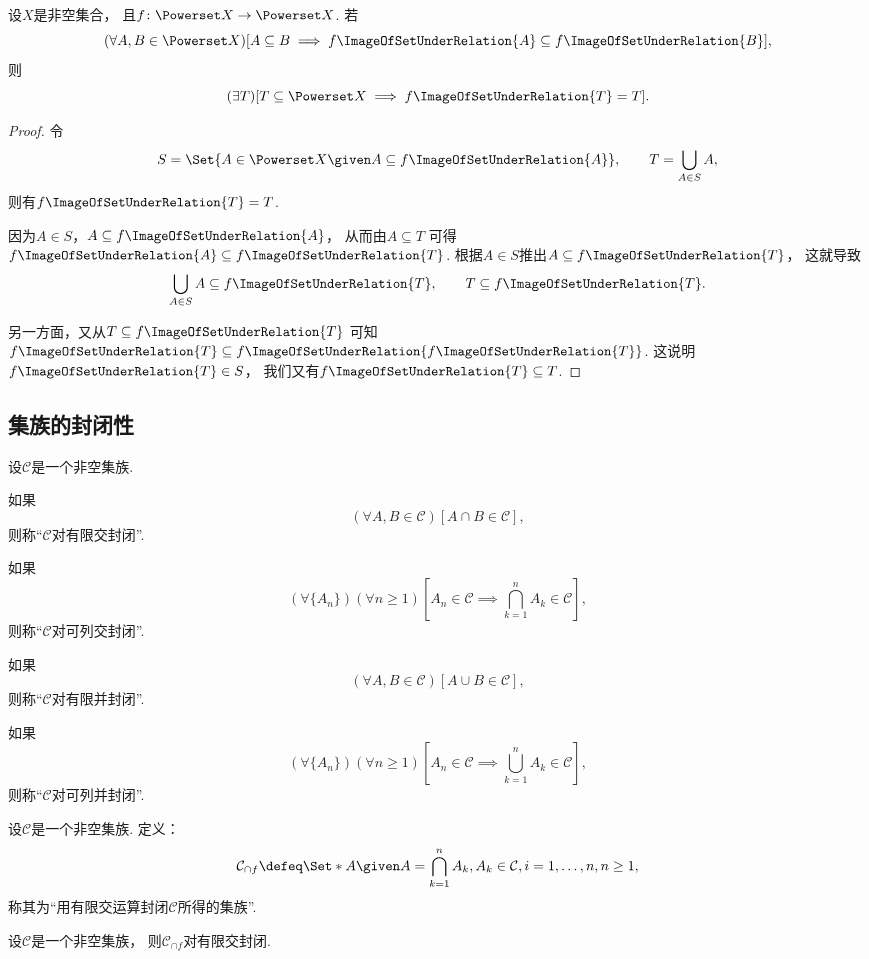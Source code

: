 \begin{example}
设\(X\)是非空集合，
且\(f\colon \Powerset X \to \Powerset X\).
若\[
	(\forall A,B \in \Powerset X)
	[
		A \subseteq B
		\implies
		f\ImageOfSetUnderRelation{A} \subseteq f\ImageOfSetUnderRelation{B}
	],
\]
则\[
	(\exists T)
	[
		T \subseteq \Powerset X
		\implies
		f\ImageOfSetUnderRelation{T} = T
	].
\]
\begin{proof}
令\[
	S = \Set{ A \in \Powerset X \given A \subseteq f\ImageOfSetUnderRelation{A} },
	\qquad
	T = \bigcup_{A \in S} A,
\]
则有\(f\ImageOfSetUnderRelation{T} = T\).

因为\(A \in S\)，\(A \subseteq f\ImageOfSetUnderRelation{A}\)，
从而由\(A \subseteq T\)
可得\(f\ImageOfSetUnderRelation{A} \subseteq f\ImageOfSetUnderRelation{T}\).
根据\(A \in S\)推出\(A \subseteq f\ImageOfSetUnderRelation{T}\)，
这就导致\[
	\bigcup_{A \in S} A \subseteq f\ImageOfSetUnderRelation{T},
	\qquad
	T \subseteq f\ImageOfSetUnderRelation{T}.
\]

另一方面，又从\(T \subseteq f\ImageOfSetUnderRelation{T}\)
可知\(f\ImageOfSetUnderRelation{T} \subseteq f\ImageOfSetUnderRelation{f\ImageOfSetUnderRelation{T}}\).
这说明\(f\ImageOfSetUnderRelation{T} \in S\)，
我们又有\(f\ImageOfSetUnderRelation{T} \subseteq T\).
\end{proof}
\end{example}

\subsection{集族的封闭性}
\begin{definition}[集族的封闭性]
设\(\mathcal{C}\)是一个非空集族.

如果\[
	(\forall A,B\in\mathcal{C})
	[A \cap B \in \mathcal{C}],
\]
则称“\(\mathcal{C}\)对有限交封闭”.

如果\[
	(\forall \{A_n\})
	(\forall n\geq1)
	\left[A_n\in\mathcal{C} \implies \bigcap_{k=1}^n A_k \in \mathcal{C}\right],
\]
则称“\(\mathcal{C}\)对可列交封闭”.

如果\[
	(\forall A,B\in\mathcal{C})
	[A \cup B \in \mathcal{C}],
\]
则称“\(\mathcal{C}\)对有限并封闭”.

如果\[
	(\forall \{A_n\})
	(\forall n\geq1)
	\left[A_n\in\mathcal{C} \implies \bigcup_{k=1}^n A_k \in \mathcal{C}\right],
\]
则称“\(\mathcal{C}\)对可列并封闭”.
\end{definition}

\begin{definition}
设\(\mathcal{C}\)是一个非空集族.
定义：\[
	\mathcal{C}_{\cap f}
	\defeq
	\Set*{
		A \given
		A = \bigcap_{k=1}^n A_k,
		A_k \in \mathcal{C}, i=1,\dotsc,n,
		n\geq1
	},
\]
称其为“用有限交运算封闭\(\mathcal{C}\)所得的集族”.
\end{definition}

\begin{proposition}
设\(\mathcal{C}\)是一个非空集族，
则\(\mathcal{C}_{\cap f}\)对有限交封闭.
\end{proposition}
